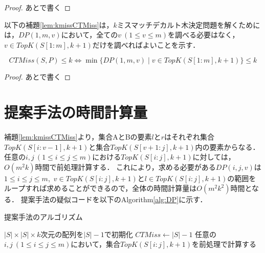 \begin{proof}
  あとで書く
\end{proof}

以下の補題\ref{lem:kmissCTMiss}は，$k$ミスマッチデカルト木決定問題を解くためには，$DP(1,m,v)$において，全ての$v\ (1\leq v \leq m)$を調べる必要はなく，$v\in TopK(S[1:m], k+1)$だけを調べればよいことを示す．
\begin{lemma}\label{lem:kmissCTMiss}
  \begin{displaymath}
    CTMiss(S,P)\leq k \Leftrightarrow \min\{DP(1,m,v) \mid v \in TopK(S[1:m], k+1)\} \leq k
  \end{displaymath}
\end{lemma}

\begin{proof}
  あとで書く
\end{proof}

\section{提案手法の時間計算量}
補題\ref{lem:kmissCTMiss}より，集合AとBの要素$l$と$r$はそれぞれ集合$TopK(S[i:v-1], k+1)$と集合$TopK(S[v+1:j], k+1)$内の要素からなる．
任意の$i,j\ (1\leq i \leq j \leq m)$における$TopK(S[i:j],k+1)$に対しては，$O(m^2k)$時間で前処理計算する．
これにより，求める必要がある$DP(i,j,v)$は$1\leq i \leq j \leq m$,\ $v \in TopK(S[i:j], k+1)$と$l\in TopK(S[i:j], k+1)$の範囲をループすれば求めることができるので，全体の時間計算量は$O(m^2k^2)$時間となる．
提案手法の疑似コードを以下のAlgorithm\ref{alg:DP}に示す．

\begin{algorithm}
  \caption{提案手法のアルゴリズム}
  \label{alg:DP}
  $|S|\times |S| \times k$次元の配列を$|S|-1$で初期化\;
  $CTMiss \leftarrow |S|-1$\;
  任意の$i,j\ (1\leq i \leq j \leq m)$において，集合$TopK(S[i:j],k+1)$を前処理で計算する\;
\end{algorithm}


